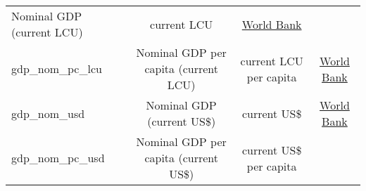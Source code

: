 \documentclass[]{article}
\begin{document}
\begin{longtable}[]{@{}lccc@{}}
\begin{minipage}[t]{0.36\columnwidth}
Nominal GDP (current LCU)\strut
\end{minipage} & \begin{minipage}[t]{0.24\columnwidth}\centering\strut
current LCU\strut
\end{minipage} & \begin{minipage}[t]{0.15\columnwidth}\centering\strut
\href{https://data.worldbank.org/indicator/NY.GDP.PCAP.CN}{World
Bank}\strut
\end{minipage}\tabularnewline
\begin{minipage}[t]{0.14\columnwidth}\raggedright\strut
gdp\_nom\_pc\_lcu\strut
\end{minipage} & \begin{minipage}[t]{0.36\columnwidth}\centering\strut
Nominal GDP per capita (current LCU)\strut
\end{minipage} & \begin{minipage}[t]{0.24\columnwidth}\centering\strut
current LCU per capita\strut
\end{minipage} & \begin{minipage}[t]{0.15\columnwidth}\centering\strut
\href{https://data.worldbank.org/indicator/NY.GDP.MKTP.CD}{World
Bank}\strut
\end{minipage}\tabularnewline
\begin{minipage}[t]{0.14\columnwidth}\raggedright\strut
gdp\_nom\_usd\strut
\end{minipage} & \begin{minipage}[t]{0.36\columnwidth}\centering\strut
Nominal GDP (current US\$)\strut
\end{minipage} & \begin{minipage}[t]{0.24\columnwidth}\centering\strut
current US\$\strut
\end{minipage} & \begin{minipage}[t]{0.15\columnwidth}\centering\strut
\href{https://data.worldbank.org/indicator/NY.GDP.PCAP.CD}{World
Bank}\strut
\end{minipage}\tabularnewline
\begin{minipage}[t]{0.14\columnwidth}\raggedright\strut
gdp\_nom\_pc\_usd\strut
\end{minipage} & \begin{minipage}[t]{0.36\columnwidth}\centering\strut
Nominal GDP per capita (current US\$)\strut
\end{minipage} & \begin{minipage}[t]{0.24\columnwidth}\centering\strut
current US\$ per capita\strut
\end{minipage} & \begin{minipage}[t]{0.15\columnwidth}\centering\strut

\end{minipage}
\end{longtable}
\end{document}
